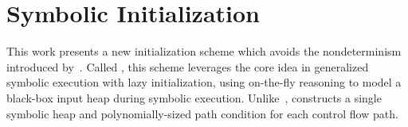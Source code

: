 \section{Symbolic Initialization}
\label{sec:precise}
%


This work presents a new initialization scheme which avoids the
nondeterminism introduced by~\gsetxt{}. Called \emph{\symtxt{}}, this scheme leverages the core idea in generalized symbolic execution
with lazy initialization, using on-the-fly reasoning to model a
black-box input heap during symbolic execution. Unlike~\gsetxt{}, \symtxt{} constructs a single
symbolic heap and polynomially-sized path condition for each control
flow path.

